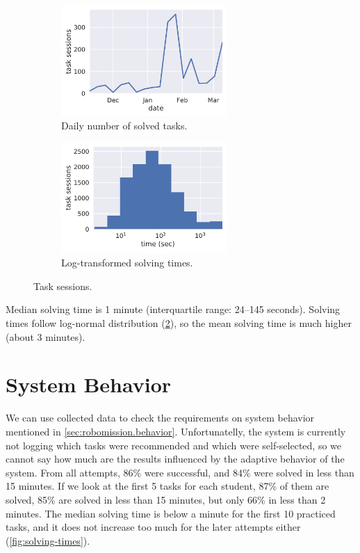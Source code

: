 \begin{figure}[htb]
\centering
\begin{subfigure}{.49\textwidth}
\centering
\includegraphics[height=42mm]{img/daily-task-sessions}
\caption{Daily number of solved tasks.} %
\label{fig:solved-count}
\end{subfigure}
\begin{subfigure}{.49\textwidth}
\centering
\includegraphics[height=42mm]{img/task-sessions-time-log}
\caption{Log-transformed solving times.}
\label{fig:solving-times-all}
\end{subfigure}
\caption{Task sessions.}
\label{fig:daily-task-sessions}
\end{figure}

Median solving time is 1 minute (interquartile range: 24--145 seconds).
Solving times follow log-normal distribution (\cref{fig:solving-times-all}),
so the mean solving time is much higher
(about 3 minutes). %


\section{System Behavior}

We can use collected data to check the requirements on system behavior mentioned in
\cref{sec:robomission.behavior}. Unfortunatelly, the system is currently not logging
which tasks were recommended and which were self-selected, so we cannot say
how much are the results influenced by the adaptive behavior of the system.
From all attempts, 86\% were successful, and 84\% were solved in less than 15 minutes.
If we look at the first 5 tasks for each student, 87\% of them are solved,
85\% are solved in less than 15 minutes, but only 66\% in less than 2 minutes.
The median solving time is below a minute for the first 10 practiced tasks,
and it does not increase too much for the later attempts either (\cref{fig:solving-times}).

